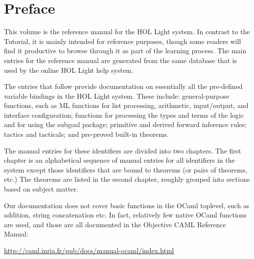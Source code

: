 \chapter*{Preface}

This volume is the reference manual for the HOL Light system. In contrast to
the Tutorial, it is mainly intended for reference purposes, though some readers
will find it productive to browse through it as part of the learning process.
The main entries for the reference manual are generated from the same database
that is used by the online HOL Light help system.

The entries that follow provide documentation on essentially all the
pre-defined {\ML} variable bindings in the HOL Light system. These include:
general-purpose functions, such as ML functions for list processing,
arithmetic, input/output, and interface configuration; functions for processing
the types and terms of the {\HOL} logic and for using the subgoal package;
primitive and derived forward inference rules; tactics and tacticals; and
pre-proved built-in theorems.

The manual entries for these {\ML} identifiers are divided into two chapters.
The first chapter is an alphabetical sequence of manual entries for all {\ML}
identifiers in the system except those identifiers that are bound to theorems
(or pairs of theorems, etc.) The theorems are listed in the second chapter,
roughly grouped into sections based on subject matter.

Our documentation does not cover basic functions in the OCaml toplevel, such as
addition, string concatenation etc. In fact, relatively few native OCaml
functions are used, and those are all documented in the Objective CAML
Reference Manual:

\url{http://caml.inria.fr/pub/docs/manual-ocaml/index.html}
